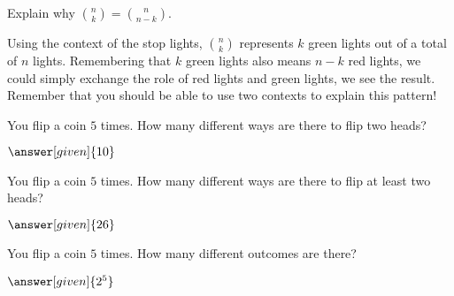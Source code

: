 \documentclass[nooutcomes]{ximera}
\begin{document}
\begin{problem}
Explain why ${n \choose k} = {n \choose n-k}$.
\begin{freeResponse}
	\begin{hint}
		Using the context of the stop lights, ${n \choose k}$ represents $k$ green lights out of a total of $n$ lights.  Remembering that $k$ green lights also means $n-k$ red lights, we could simply exchange the role of red lights and green lights, we see the result.  Remember that you should be able to use two contexts to explain this pattern!
	\end{hint}
\end{freeResponse}
\end{problem}






\begin{problem}
	You flip a coin $5$ times.  How many different ways are there to flip two heads?
	\begin{prompt}
		$\answer[given]{10}$
	\end{prompt}
\end{problem}

\begin{problem}
	You flip a coin $5$ times.  How many different ways are there to flip at least two heads?
	\begin{prompt}
		$\answer[given]{26}$
	\end{prompt}
\end{problem}


\begin{problem}
	You flip a coin $5$ times.  How many different outcomes are there?
	\begin{prompt}
		$\answer[given]{2^5}$
	\end{prompt}
\end{problem}
\end{document}
